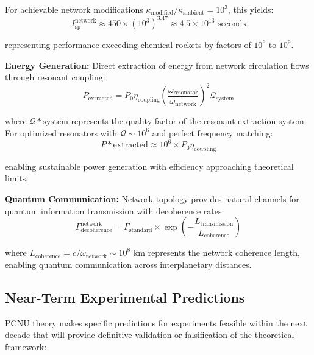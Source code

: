 \documentclass[11pt,a4paper]{article}
\begin{document}
For achievable network modifications $\kappa_{\text{modified}}/\kappa_{\text{ambient}} = 10^3$, this yields:
\begin{equation}
I_{\text{sp}}^{\text{network}} \approx 450 \times (10^3)^{3.47} \approx 4.5 \times 10^{13} \text{ seconds}
\label{eq:propulsion_performance}
\end{equation}

representing performance exceeding chemical rockets by factors of $10^6$ to $10^9$.

\textbf{Energy Generation:}
Direct extraction of energy from network circulation flows through resonant coupling:
\begin{equation}
P_{\text{extracted}} = P_0 \eta_{\text{coupling}} \left(\frac{\omega_{\text{resonator}}}{\omega_{\text{network}}}\right)^2 \mathcal{Q}_{\text{system}}
\label{eq:energy_extraction}
\end{equation}

where $\mathcal{Q}*{\text{system}}$ represents the quality factor of the resonant extraction system. For optimized resonators with $\mathcal{Q} \sim 10^6$ and perfect frequency matching:
\begin{equation}
P*{\text{extracted}} \approx 10^6 \times P_0 \eta_{\text{coupling}}
\label{eq:energy_amplification}
\end{equation}

enabling sustainable power generation with efficiency approaching theoretical limits.

\textbf{Quantum Communication:}
Network topology provides natural channels for quantum information transmission with decoherence rates:
\begin{equation}
\Gamma_{\text{decoherence}}^{\text{network}} = \Gamma_{\text{standard}} \times \exp\left(-\frac{L_{\text{transmission}}}{L_{\text{coherence}}}\right)
\label{eq:network_decoherence}
\end{equation}

where $L_{\text{coherence}} = c/\omega_{\text{network}} \sim 10^{8}$ km represents the network coherence length, enabling quantum communication across interplanetary distances.

\subsection{Near-Term Experimental Predictions}

PCNU theory makes specific predictions for experiments feasible within the next decade that will provide definitive validation or falsification of the theoretical framework:
\end{document}
